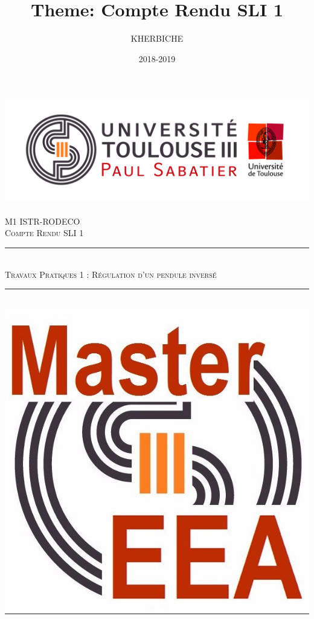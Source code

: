 \documentclass[12pt, a4paper, openany]{report}
\title{Theme: Compte Rendu SLI 1}
\author{KHERBICHE \bsc{Ali}}
\date{2018-2019}
\newcommand{\HRule}{\rule{\linewidth}{0.5mm}}
\begin{document}
\makeatletter
\begin{titlepage}
\begin{sffamily}
\begin{center}
    \includegraphics[scale=0.5]{Logo_UT3.jpg}~\\[1.5cm]
    \textsc{\LARGE M1 ISTR-RODECO  }\\[2cm]
    \textsc{\Large Compte Rendu SLI 1}\\[1.5cm]
    \HRule \\[0.4cm] %
    { \huge  \textsc {Travaux Pratiques 1 : Régulation d'un pendule inversé\\[0.4cm] }}
    \HRule \\[1cm]   %
    \includegraphics[scale=0.1]{logomaster.jpg}

\end{center}
\end{sffamily}
\end{titlepage}
\end{document}

